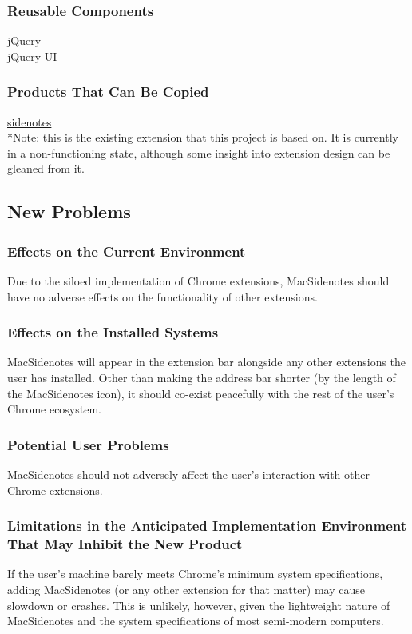 \documentclass[12pt, titlepage]{article}
\begin{document}
\subsubsection{Reusable Components}
	\href{https://jquery.com}
	{jQuery}\\
	\href{http://jqueryui.com/}
	{jQuery UI}
	
\subsubsection{Products That Can Be Copied}
	\href{https://github.com/sidenotes/sidenotes}
	{sidenotes}\\
	*Note: this is the existing extension that this project is based on. It is currently in a non-functioning state, although some insight into extension design can be gleaned from it.
\subsection{New Problems}
\subsubsection{Effects on the Current Environment}
	Due to the siloed implementation of Chrome extensions, MacSidenotes should have no adverse effects on the functionality of other extensions.
\subsubsection{Effects on the Installed Systems}
	MacSidenotes will appear in the extension bar alongside any other extensions the user has installed. Other than making the address bar shorter (by the length of the MacSidenotes icon), it should co-exist peacefully with the rest of the user's Chrome ecosystem.
\subsubsection{Potential User Problems}
	MacSidenotes should not adversely affect the user's interaction with other Chrome extensions.
\subsubsection{Limitations in the Anticipated Implementation Environment That May Inhibit the New Product} 	
	If the user's machine barely meets Chrome's minimum system specifications, adding MacSidenotes (or any other extension for that matter) may cause slowdown or crashes. This is unlikely, however, given the lightweight nature of MacSidenotes and the system specifications of most semi-modern computers.
	
\end{document}
